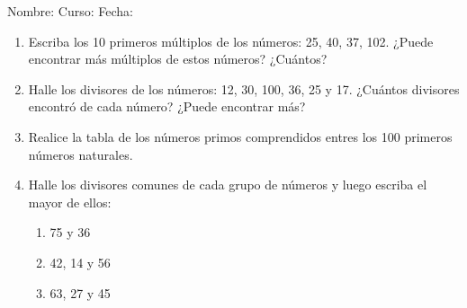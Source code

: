 \documentclass[letterpaper,fleqn]{article}
\newcommand{\LineaNombre}{%
\par
\vspace{\baselineskip}
Nombre:\hrulefill \; Curso: \underline{\hspace*{48pt}} \; Fecha: \underline{\hspace*{2.5cm}} \relax
\par}
\begin{document}
\LineaNombre
\begin{enumerate}
 \item Escriba los 10 primeros múltiplos de los números: 25, 40, 37, 102. ¿Puede encontrar más múltiplos de estos números? ¿Cuántos?\noanswer
 \item Halle los divisores de los números: 12, 30, 100, 36, 25 y 17. ¿Cuántos divisores encontró de cada número? ¿Puede encontrar más?\noanswer
 \item Realice la tabla de los números primos comprendidos entres los 100 primeros números naturales.\noanswer
 \item Halle los divisores comunes de cada grupo de números y luego escriba el mayor de ellos:
 \begin{enumerate}
 \item 75 y 36 \noanswer
 \item 42, 14 y 56
 \item 63, 27 y 45
 \end{enumerate}
 \end{enumerate}
\end{document}
